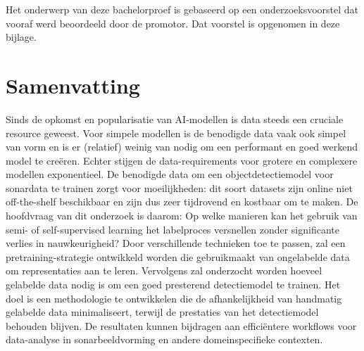 \documentclass[dutch,dit,thesis]{hogentreport}
\begin{document}
Het onderwerp van deze bachelorproef is gebaseerd op een onderzoeksvoorstel dat vooraf werd beoordeeld door de promotor. Dat voorstel is opgenomen in deze bijlage.

\section*{Samenvatting}

Sinds de opkomst en popularisatie van AI-modellen is data steeds een cruciale resource geweest. Voor simpele modellen is de benodigde data vaak ook simpel van vorm en is er (relatief) weinig van nodig om een performant en goed werkend model te creëren. Echter stijgen de data-requirements voor grotere en complexere modellen exponentieel. De benodigde data om een objectdetectiemodel voor sonardata te trainen zorgt voor moeilijkheden: dit soort datasets zijn online niet off-the-shelf beschikbaar en zijn dus zeer tijdrovend en kostbaar om te maken. De hoofdvraag van dit onderzoek is daarom: Op welke manieren kan het gebruik van semi- of self-supervised learning het labelproces versnellen zonder significante verlies in nauwkeurigheid? Door verschillende technieken toe te passen, zal een pretraining-strategie ontwikkeld worden die gebruikmaakt van ongelabelde data om representaties aan te leren. Vervolgens zal onderzocht worden hoeveel gelabelde data nodig is om een goed presterend detectiemodel te trainen. Het doel is een methodologie te ontwikkelen die de afhankelijkheid van handmatig gelabelde data minimaliseert, terwijl de prestaties van het detectiemodel behouden blijven. De resultaten kunnen bijdragen aan efficiëntere workflows voor data-analyse in sonarbeeldvorming en andere domeinspecifieke contexten.

\newpage






\backmatter{}

\setlength\bibitemsep{2pt} %
\printbibliography[heading=bibintoc]
\end{document}
